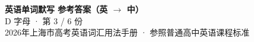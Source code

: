 \documentclass[10pt,a4paper]{article}
\begin{document}
\pagestyle{plain}

\begin{center}
{\LARGE\bfseries 英语单词默写 \quad 参考答案（英 $\to$ 中）}\\[0.22em]
{\large D 字母 · 第 3 / 6 份}\\[0.18em]
{\small 2026年上海市高考英语词汇用法手册 · 参照普通高中英语课程标准}
\end{center}

\vspace{0.2em}
\noindent{\color{rulegray}\rule{\textwidth}{0.8pt}}

\vspace{0.35em}

\vspace{0.25em}
\renewcommand{\arraystretch}{1.32}
\end{document}

